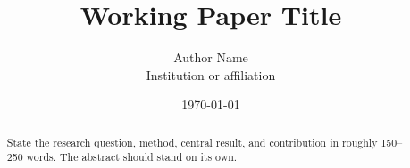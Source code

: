 \documentclass[11pt]{article}
\title{Working Paper Title}
\author{Author Name\\\small Institution or affiliation}
\date{\today}
\begin{document}
\maketitle

\begin{abstract}
State the research question, method, central result, and contribution in roughly
150--250 words. The abstract should stand on its own.
\end{abstract}






% 
% 
\end{document}
